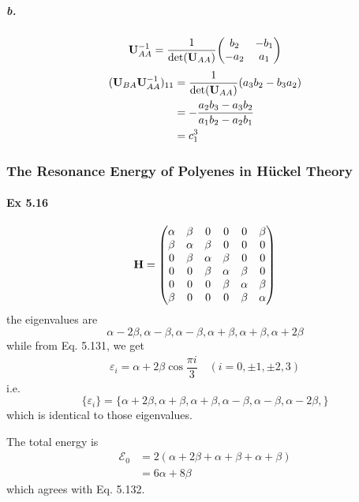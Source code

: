\documentclass[a4paper]{article}
\newcommand{\ex}[1]{\paragraph{Ex #1}}
\newcommand{\subex}[1]{\subparagraph{#1}}
\numberwithin{equation}{subsection}
\begin{document}
\subex{b.}
\begin{align}
\vb{U}_{AA}^{-1} = \dfrac{1}{\det(\vb{U}_{AA})} \mqty(b_2 & -b_1\\ -a_2 & a_1)
\end{align}
\begin{align}
(\vb{U}_{BA} \vb{U}_{AA}^{-1})_{11} 
&= \dfrac{1}{\det(\vb{U}_{AA})} (a_3 b_2 - b_3 a_2) \notag\\
&= -\dfrac{a_2 b_3 - a_3 b_2}{a_1 b_2 - a_2 b_1} \notag\\
&= c_1^3
\end{align}


\subsubsection{The Resonance Energy of Polyenes in H\"uckel Theory}
\ex{5.16}
\begin{align}
\vb{H} = 
\mqty(\alpha & \beta & 0 & 0 & 0 & \beta\\
      \beta & \alpha & \beta & 0 & 0 & 0 \\
      0 & \beta & \alpha & \beta & 0 & 0 \\
      0 & 0 & \beta & \alpha & \beta & 0 \\
      0 & 0 & 0 & \beta & \alpha & \beta \\
      \beta & 0 & 0 & 0 & \beta & \alpha \\
      )
\end{align}
the eigenvalues are
\begin{equation}\label{key}
\alpha - 2\beta, \alpha - \beta, \alpha - \beta, \alpha + \beta, \alpha + \beta, \alpha + 2\beta
\end{equation}
while from Eq. 5.131, we get 
\begin{align}
\varepsilon_i = \alpha + 2\beta\cos\dfrac{\pi i}{3} \quad (i=0,\pm 1, \pm 2, 3)
\end{align}
i.e.
\begin{equation}\label{key}
\{\varepsilon_i\} = \{\alpha+2\beta, \alpha + \beta, \alpha + \beta, \alpha - \beta, \alpha - \beta, \alpha - 2\beta, \}
\end{equation}
which is identical to those eigenvalues.

The total energy is
\begin{align}
\mathscr{E}_0 &= 2(\alpha+2\beta + \alpha+\beta + \alpha+\beta)\\
&= 6\alpha + 8\beta
\end{align}
which agrees with Eq. 5.132.
\end{document}

